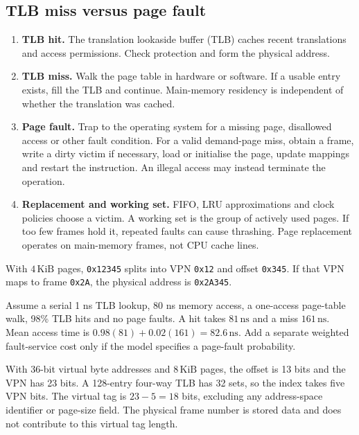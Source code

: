 \documentclass[12pt,a4paper]{article}
\begin{document}
\subsection{TLB miss versus page fault}
\begin{enumerate}[leftmargin=*,itemsep=3pt]
\item \textbf{TLB hit.} The translation lookaside buffer (TLB) caches recent translations and access permissions. Check protection and form the physical address.
\item \textbf{TLB miss.} Walk the page table in hardware or software. If a usable entry exists, fill the TLB and continue. Main-memory residency is independent of whether the translation was cached.
\item \textbf{Page fault.} Trap to the operating system for a missing page, disallowed access or other fault condition. For a valid demand-page miss, obtain a frame, write a dirty victim if necessary, load or initialise the page, update mappings and restart the instruction. An illegal access may instead terminate the operation.
\item \textbf{Replacement and working set.} FIFO, LRU approximations and clock policies choose a victim. A working set is the group of actively used pages. If too few frames hold it, repeated faults can cause thrashing. Page replacement operates on main-memory frames, not CPU cache lines.
\end{enumerate}
\begin{tcolorbox}[examplebox,title={Translate an address and compute TLB timing}]
With $4\,\mathrm{KiB}$ pages, \texttt{0x12345} splits into VPN \texttt{0x12} and offset \texttt{0x345}. If that VPN maps to frame \texttt{0x2A}, the physical address is \texttt{0x2A345}.

Assume a serial 1 ns TLB lookup, 80 ns memory access, a one-access page-table walk, 98\% TLB hits and no page faults. A hit takes $81\,\mathrm{ns}$ and a miss $161\,\mathrm{ns}$. Mean access time is $0.98(81)+0.02(161)=82.6\,\mathrm{ns}$. Add a separate weighted fault-service cost only if the model specifies a page-fault probability.
\end{tcolorbox}

\begin{tcolorbox}[examplebox,title={Size a set-associative TLB tag}]
With 36-bit virtual byte addresses and $8\,\mathrm{KiB}$ pages, the offset is 13 bits and the VPN has 23 bits. A 128-entry four-way TLB has 32 sets, so the index takes five VPN bits. The virtual tag is $23-5=18$ bits, excluding any address-space identifier or page-size field. The physical frame number is stored data and does not contribute to this virtual tag length.
\end{tcolorbox}
\end{document}
